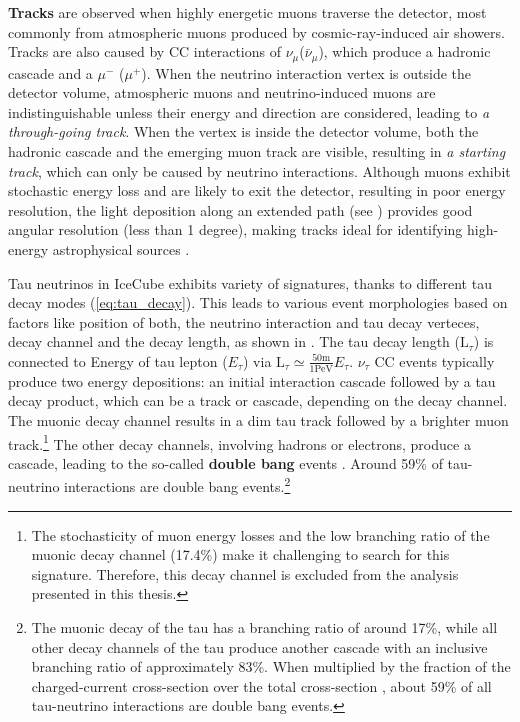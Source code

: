 \textbf{Tracks} are observed when highly energetic muons traverse the detector, most commonly from atmospheric muons produced by cosmic-ray-induced air showers. Tracks are also caused by CC interactions of $\nu_{\mu}$($\bar{\nu}_\mu$), which produce a hadronic cascade and a $\mu^-$ ($\mu^+$). When the neutrino interaction vertex is outside the detector volume, atmospheric muons and neutrino-induced muons are indistinguishable unless their energy and direction are considered, leading to \emph{a through-going track}. When the vertex is inside the detector volume, both the hadronic cascade and the emerging muon track are visible, resulting in \emph{a starting track}, which can only be caused by neutrino interactions. Although muons exhibit stochastic energy loss and are likely to exit the detector, resulting in poor energy resolution, the light deposition along an extended path (see ) provides good angular resolution (less than 1 degree), making tracks ideal for identifying high-energy astrophysical sources \cite{energy_reco}.

Tau neutrinos in IceCube exhibits variety of signatures, thanks to different tau decay modes (\ref{eq:tau_decay}). This leads to various event morphologies  based on factors like position of both, the neutrino interaction and tau decay verteces, decay channel and the decay length, as shown in . The tau decay length ($\mathrm{L}_\tau$) is connected to Energy of tau lepton ($E_{\tau}$) via $\mathrm{L}_{\tau}\simeq\frac{50\mathrm{m}}{1\mathrm{PeV}}E_{\tau}$. $\nu_{\tau}$ CC events typically produce two energy depositions: an initial interaction cascade followed by a tau decay product, which can be a track or cascade, depending on the decay channel. The muonic decay channel results in a dim tau track followed by a brighter muon track.\footnote{The stochasticity of muon energy losses and the low branching ratio of the muonic decay channel (17.4\%) make it challenging to search for this signature. Therefore, this decay channel is excluded from the analysis presented in this thesis.} The other decay channels, involving hadrons or electrons, produce a cascade, leading to the so-called \textbf{double bang} events . Around 59\% of tau-neutrino interactions are double bang events.\footnote{The muonic decay of the tau has a branching ratio of around 17\%, while all other decay channels of the tau produce another cascade with an inclusive branching ratio of approximately 83\%. When multiplied by the fraction of the charged-current cross-section over the total cross-section \cite{PDG_2024}, about 59\% of all tau-neutrino interactions are double bang events.}

